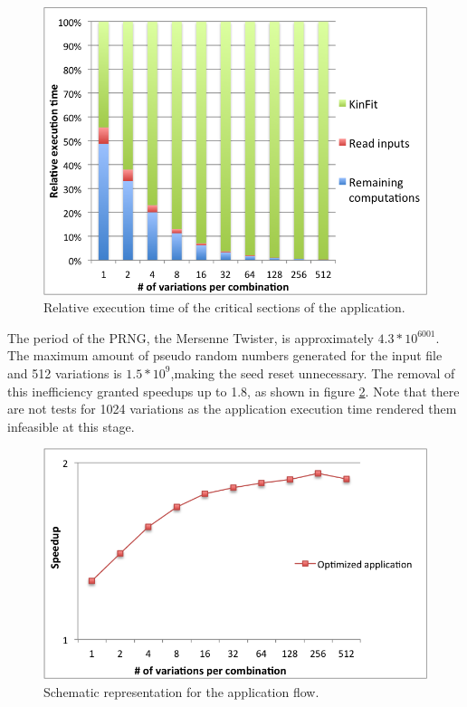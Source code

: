 \begin{figure}[!htp]
	\begin{center}
		\includegraphics[scale=0.4]{charts/relative_exec_time_kinfit_rest.png}
		\caption{Relative execution time of the critical sections of the \tth application.}
		\label{fig:ttDilepKinFit}
	\end{center}
\end{figure}

The period of the PRNG, the Mersenne Twister, is approximately $4.3 * 10^{6001}$. The maximum amount of pseudo random numbers generated for the input file and 512 variations is $1.5 * 10^9$,making the seed reset unnecessary. The removal of this inefficiency granted speedups up to 1.8, as shown in figure \ref{fig:PRNG}. Note that there are not tests for 1024 variations as the application execution time rendered them infeasible at this stage.

\begin{figure}[!htp]
	\begin{center}
		\includegraphics[scale=0.4]{charts/speedup_trandom_optim.png}
		\caption{Schematic representation for the \tth application flow.}
		\label{fig:PRNG}
	\end{center}
\end{figure}

